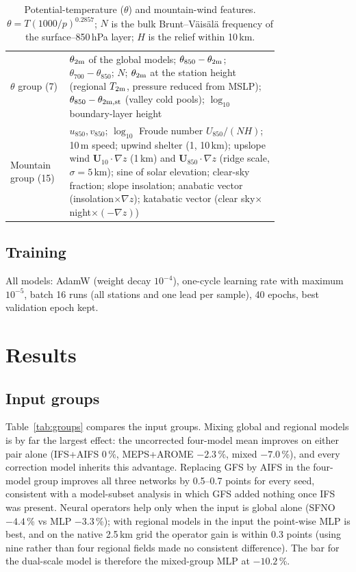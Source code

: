 \documentclass[10pt,a4paper]{article}
\begin{document}
\begin{table}[t]
\centering\small
\caption{Potential-temperature ($\theta$) and mountain-wind features. $\theta=T(1000/p)^{0.2857}$;
$N$ is the bulk Brunt--V\"ais\"al\"a frequency of the surface--850\,hPa layer; $H$ is the relief
within 10\,km.}\label{tab:phys}
\begin{tabular}{@{}lp{0.78\linewidth}@{}}
\toprule
$\theta$ group (7) & $\theta_{2\rm m}$ of the global models; $\theta_{850}-\theta_{2\rm m}$; $\theta_{700}-\theta_{850}$; $N$;
$\theta_{2\rm m}$ at the station height (regional $T_{2\rm m}$, pressure reduced from MSLP); $\theta_{850}-\theta_{2\rm m,st}$ (valley cold pools); $\log_{10}$ boundary-layer height\\
Mountain group (15) & $u_{850}, v_{850}$; $\log_{10}$ Froude number $U_{850}/(NH)$; 10\,m speed; upwind shelter (1, 10\,km);
upslope wind $\mathbf U_{10}\cdot\nabla z$ (1\,km) and $\mathbf U_{850}\cdot\nabla z$ (ridge scale, $\sigma=5$\,km); sine of solar elevation;
clear-sky fraction; slope insolation; anabatic vector (insolation$\times\nabla z$); katabatic vector (clear sky$\times$night$\times(-\nabla z)$)\\
\bottomrule
\end{tabular}
\end{table}

\subsection{Training}
All models: AdamW (weight decay $10^{-4}$), one-cycle learning rate with maximum $10^{-5}$, batch
16 runs (all stations and one lead per sample), 40 epochs, best validation epoch kept.

\section{Results}\label{sec:results}
\subsection{Input groups}
Table~\ref{tab:groups} compares the input groups. Mixing global and regional models is by far the
largest effect: the uncorrected four-model mean improves on either pair alone (IFS+AIFS 0\,\%,
MEPS+AROME $-2.3$\,\%, mixed $-7.0$\,\%), and every correction model inherits this advantage.
Replacing GFS by AIFS in the four-model group improves all three networks by 0.5--0.7 points for
every seed, consistent with a model-subset analysis in which GFS added nothing once IFS was present.
Neural operators help only when the input is global alone (SFNO $-4.4$\,\% vs MLP $-3.3$\,\%); with
regional models in the input the point-wise MLP is best, and on the native 2.5\,km grid the operator
gain is within 0.3 points (using nine rather than four regional fields made no consistent
difference). The bar for the dual-scale model is therefore the mixed-group MLP at $-10.2$\,\%.
\end{document}
